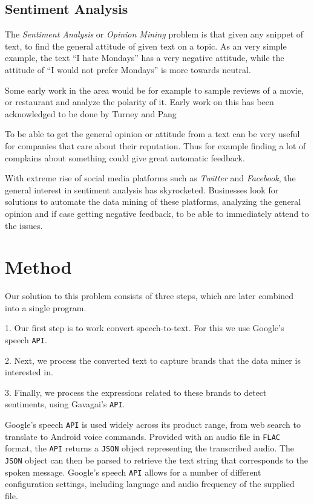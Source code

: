 \documentclass[a4paper,12pt,twoside]{ltxdoc}
\begin{document}
\subsection{Sentiment Analysis}
The \emph{Sentiment Analysis} or \emph{Opinion Mining} problem is that given any snippet of text, to find the general attitude of given text on a topic.
As an very simple example, the text ``I hate Mondays'' has a very negative attitude, while the attitude of ``I would not prefer Mondays'' is more towards neutral.

Some early work in the area would be for example to sample reviews of a movie, or restaurant and analyze the polarity of it. Early work on this has been acknowledged to be done by Turney\cite{turney} and Pang\cite{pang}

To be able to get the general opinion or attitude from a text can be very useful for companies that care about their reputation.
Thus for example finding a lot of complains about something could give great automatic feedback.

With extreme rise of social media platforms such as \emph{Twitter} and \emph{Facebook}, the general interest in sentiment analysis has skyrocketed. Businesses look for solutions to automate the data mining of these platforms, analyzing the general opinion and if case getting negative feedback, to be able to immediately attend to the issues.

\section{Method}

Our solution to this problem consists of three steps, which are later combined into a single program.

1. Our first step is to work convert speech-to-text. For this we use Google's speech \verb#API#.

2. Next, we process the converted text to capture brands that the data miner is interested in.

3. Finally, we process the expressions related to these brands to detect sentiments, using Gavagai's \verb#API#.

Google's speech \verb#API# is used widely across its product range, from web search to translate to Android voice commands.
Provided with an audio file in \verb#FLAC# format, the \verb#API# returns a \verb#JSON# object representing the transcribed audio. The \verb#JSON# object
can then be parsed to retrieve the text string that corresponds to the spoken message. Google's speech \verb#API# allows for a number
of different configuration settings, including language and audio frequency of the supplied file.
\end{document}
